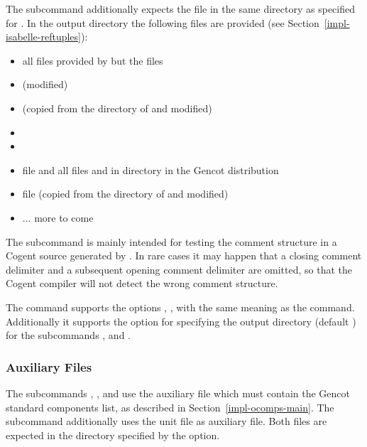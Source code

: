 The subcommand  additionally expects the file  in the same directory 
as specified for . In the output directory the following files are provided (see Section~\ref{impl-isabelle-reftuples}):
\begin{itemize}
\item all files provided by  but the  files
\item {} (modified)
\item {} (copied from the directory of  and modified)
\item {}
\item {}
\item file  and all files  and  
in directory  in the Gencot distribution
\item file  (copied from the directory of  and modified)
\item ... more to come
\end{itemize}

The subcommand  is mainly intended for testing the comment structure in a Cogent source generated by
. In rare cases it may happen that a closing comment delimiter and a subsequent opening comment delimiter
are omitted, so that the Cogent compiler will not detect the wrong comment structure.

The  command supports the options , ,  with the same meaning as
the  command. Additionally it supports the option  for specifying the output directory (default )
for the subcommands ,  and .

\subsubsection{Auxiliary Files}

The subcommands , , and  use the auxiliary file  which must contain the Gencot
standard components list, as described in Section~\ref{impl-ocomps-main}. The subcommand  additionally uses the 
unit file  as auxiliary file. Both files are expected in the directory specified 
by the  option.

